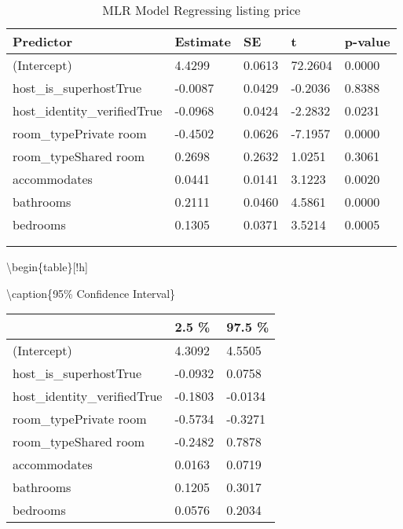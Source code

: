 \documentclass[
]{article}
\begin{document}
\begin{table}[!h]

\caption{\label{tab:unnamed-chunk-18}MLR Model Regressing listing price}
\centering
\begin{tabu} to 
\hline
Predictor & Estimate & SE & t & p-value\\
\hline
(Intercept) & 4.4299 & 0.0613 & 72.2604 & 0.0000\\
\hline
host\_is\_superhostTrue & -0.0087 & 0.0429 & -0.2036 & 0.8388\\
\hline
host\_identity\_verifiedTrue & -0.0968 & 0.0424 & -2.2832 & 0.0231\\
\hline
room\_typePrivate room & -0.4502 & 0.0626 & -7.1957 & 0.0000\\
\hline
room\_typeShared room & 0.2698 & 0.2632 & 1.0251 & 0.3061\\
\hline
accommodates & 0.0441 & 0.0141 & 3.1223 & 0.0020\\
\hline
bathrooms & 0.2111 & 0.0460 & 4.5861 & 0.0000\\
\hline
bedrooms & 0.1305 & 0.0371 & 3.5214 & 0.0005\\
\hline
{}\\
\\
\end{tabu}
\end{table}

\textbackslash begin\{table\}{[}!h{]}

\textbackslash caption\{\label{tab:unnamed-chunk-19}95\% Confidence
Interval\} \centering

\begin{tabu} to 
\hline
  & 2.5 \% & 97.5 \%\\
\hline
(Intercept) & 4.3092 & 4.5505\\
\hline
host\_is\_superhostTrue & -0.0932 & 0.0758\\
\hline
host\_identity\_verifiedTrue & -0.1803 & -0.0134\\
\hline
room\_typePrivate room & -0.5734 & -0.3271\\
\hline
room\_typeShared room & -0.2482 & 0.7878\\
\hline
accommodates & 0.0163 & 0.0719\\
\hline
bathrooms & 0.1205 & 0.3017\\
\hline
bedrooms & 0.0576 & 0.2034\\
\hline
\end{tabu}
\end{document}
